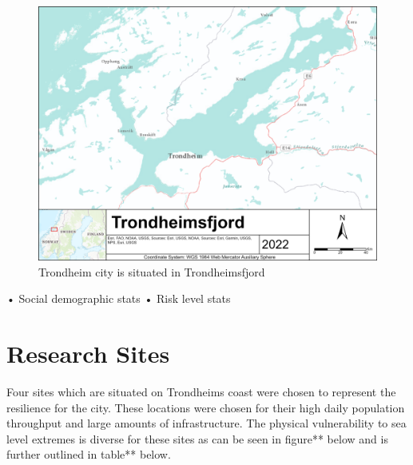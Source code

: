 \begin{figure}[h!]
    \centering
    \includegraphics[width=1.0\textwidth]{fig/Trondheimsfjord.png}
    \caption{Trondheim city is situated in Trondheimsfjord}
    \label{fig:research area Trondheim}
\end{figure}

•	Social demographic stats
•	Risk level stats

\section{Research Sites}
Four sites which are situated on Trondheims coast were chosen to represent the resilience for the city. These locations were chosen for their high daily population throughput and large amounts of infrastructure. The physical vulnerability to sea level extremes is diverse for these sites as can be seen in figure** below and is further outlined in table** below. 
\paragraph{}

